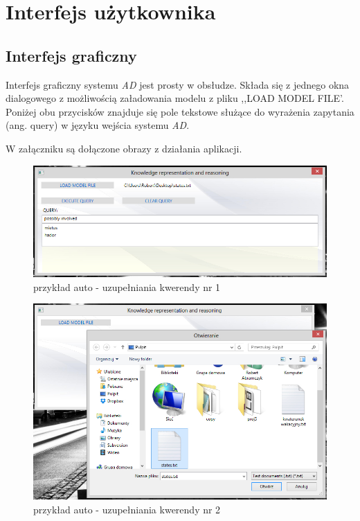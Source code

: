 \documentclass[a4paper]{article}
\begin{document}
\section{Interfejs użytkownika}
    \subsection{Interfejs graficzny}

        Interfejs graficzny systemu \textit{AD} jest prosty w obsłudze.
        Składa się z jednego okna dialogowego z możliwością załadowania
        modelu z pliku ,,LOAD MODEL FILE'. Poniżej obu przycisków znajduje się pole tekstowe
        służące do wyrażenia zapytania (ang. query) w języku wejścia 
        systemu \textit{AD}.

        W załączniku są dołączone obrazy z działania aplikacji.

        \begin{figure}[p]
            \centering
            \includegraphics[width=\textwidth]{images/acomp_1.jpg}
            \caption{przykład auto - uzupełniania kwerendy nr 1}
            \label{fig:acomp1}
        \end{figure}

        \begin{figure}[p]
            \centering
            \includegraphics[width=\textwidth]{images/acomp_2.jpg}
            \caption{przykład auto - uzupełniania kwerendy nr 2}
            \label{fig:acomp2}
        \end{figure}
\end{document}
